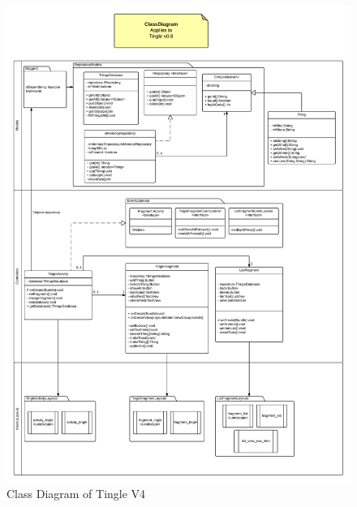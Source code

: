 \documentclass{article}
\begin{document}
\begin{figure}[h!]
	\centering
	\includegraphics[scale=0.4]{"TingleApp_ClassDiagram V08"}
	\caption{Class Diagram of Tingle V4}
	\label{fig:TingleApp_ClassDiagramV08}
\end{figure}

\pagebreak
\end{document}
